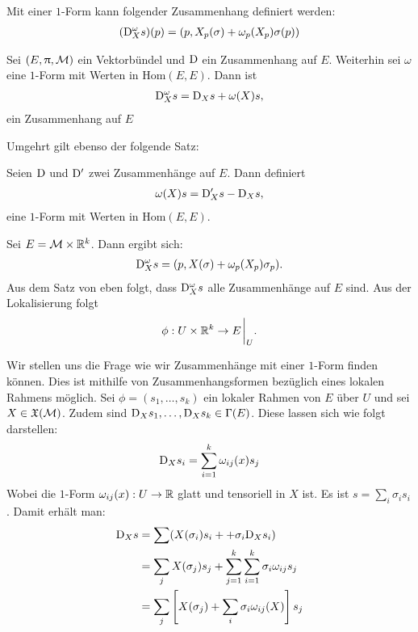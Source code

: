 \begin{defs}
Mit einer $1$-Form kann folgender Zusammenhang definiert werden:
\begin{align}
(\mathrm{D}^\omega_X s)(p) = (p, X_p(\sigma) + \omega_p(X_p) \sigma(p))
\end{align}
\end{defs}

\begin{satz}
\label{satz:zusammenhangausform}
Sei $(E, \uppi, \mathcal{M})$ ein Vektorbündel und $\mathrm{D}$ ein Zusammenhang auf $E$.
Weiterhin sei $\omega$ eine $1$-Form mit Werten in $\mathrm{Hom}(E, E)$.
Dann ist 
\begin{align}
\mathrm{D}^\omega_X s = \mathrm{D}_X s + \omega(X) s,
\end{align}
ein Zusammenhang auf $E$
\end{satz}

Umgehrt gilt ebenso der folgende Satz:

\begin{satz}
Seien $\mathrm{D}$ und $\mathrm{D}'$ zwei Zusammenhänge auf $E$.
Dann definiert 
\begin{align}
\omega(X) s = \mathrm{D}'_X s - \mathrm{D}_X s,
\end{align}
eine $1$-Form mit Werten in $\mathrm{Hom}(E, E)$.
\end{satz}

\begin{bsp}
Sei $E = \mathcal{M} \times \mathbb{R}^k$. Dann ergibt sich:
\begin{align}
\mathrm{D}^\omega_X s = (p, X(\sigma) + \omega_p (X_p)\sigma_p).
\end{align}
Aus dem Satz von eben folgt, dass $\mathrm{D}^\omega_X s$ alle Zusammenhänge auf $E$ sind.
Aus der Lokalisierung folgt
\begin{align*}
\phi : U \times \R^k \to E\eval_U.
\end{align*}
\end{bsp}
Wir stellen uns die Frage wie wir Zusammenhänge mit einer $1$-Form finden können.
Dies ist mithilfe von Zusammenhangsformen bezüglich eines lokalen Rahmens möglich.
Sei $\phi = (s_1, \dots, s_k)$ ein lokaler Rahmen von $E$ über $U$ und sei $X \in \mathfrak{X}(\mathcal{M})$.
Zudem sind $\mathrm{D}_X s_1, \dots, \mathrm{D}_X s_k \in \Gamma(E)$.
Diese lassen sich wie folgt darstellen:
\begin{align}
\mathrm{D}_X s_i = \sum_{i=1}^k \omega_{ij}(x) s_j
\end{align}
Wobei die $1$-Form $\omega_{ij}(x): U \to \mathbb{R}$ glatt und tensoriell in $X$ ist.
Es ist $s = \sum_i \sigma_i s_i$. 
Damit erhält man:
\begin{align*}
\mathrm{D}_X s &= \sum (X(\sigma_i)s_i + + \sigma_i \mathrm{D}_X s_i)\\
&= \sum_j X(\sigma_j)s_j + \sum_{j=1}^k \sum_{i=1}^k \sigma_i \omega_{ij} s_j\\
&= \sum_j \left[ X(\sigma_j) + \sum_i \sigma_i \omega_{ij}(X) \right] s_j
\end{align*}